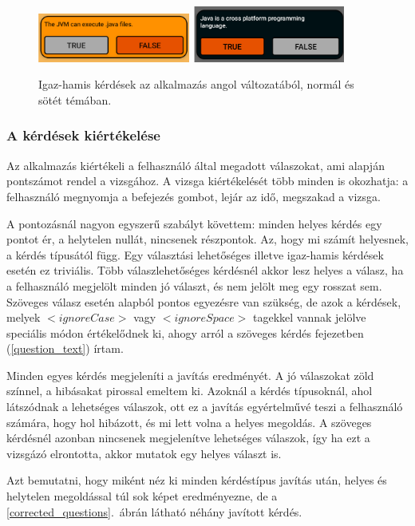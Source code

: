 \documentclass[12pt,a4paper]{article}
\begin{document}
	\begin{figure}[h!]
		\centering
		\includegraphics[width=5cm]{question_true_false}
		\includegraphics[width=5cm]{question_true_false_dark}
		\caption{Igaz-hamis kérdések az alkalmazás angol változatából, normál és sötét témában.}
		\label{question_true_false_figure}
	\end{figure}
	
	\subsubsection{A kérdések kiértékelése}
	
	Az alkalmazás kiértékeli a felhasználó által megadott válaszokat, ami alapján pontszámot rendel a vizsgához. A vizsga kiértékelését több minden is okozhatja: a felhasználó megnyomja a befejezés gombot, lejár az idő, megszakad a vizsga.
	
	A pontozásnál nagyon egyszerű szabályt követtem: minden helyes kérdés egy pontot ér, a helytelen nullát, nincsenek részpontok. Az, hogy mi számít helyesnek, a kérdés típusától függ. Egy választási lehetőséges illetve igaz-hamis kérdések esetén ez triviális. Több válaszlehetőséges kérdésnél akkor lesz helyes a válasz, ha a felhasználó megjelölt minden jó választ, és nem jelölt meg egy rosszat sem. Szöveges válasz esetén alapból pontos egyezésre van szükség, de azok a kérdések, melyek $<ignoreCase>$ vagy $<ignoreSpace>$ tagekkel vannak jelölve speciális módon értékelődnek ki, ahogy arról a szöveges kérdés fejezetben (\ref{question_text}) írtam.
	
	Minden egyes kérdés megjeleníti a javítás eredményét. A jó válaszokat zöld színnel, a hibásakat pirossal emeltem ki. Azoknál a kérdés típusoknál, ahol látszódnak a lehetséges válaszok, ott ez a javítás egyértelművé teszi a felhasználó számára, hogy hol hibázott, és mi lett volna a helyes megoldás. A szöveges kérdésnél azonban nincsenek megjelenítve lehetséges válaszok, így ha ezt a vizsgázó elrontotta, akkor mutatok egy helyes választ is.
	
	Azt bemutatni, hogy miként néz ki minden kérdéstípus javítás után, helyes és helytelen megoldással túl sok képet eredményezne, de a \ref{corrected_questions}.\ ábrán látható néhány javított kérdés.
	
\end{document}
